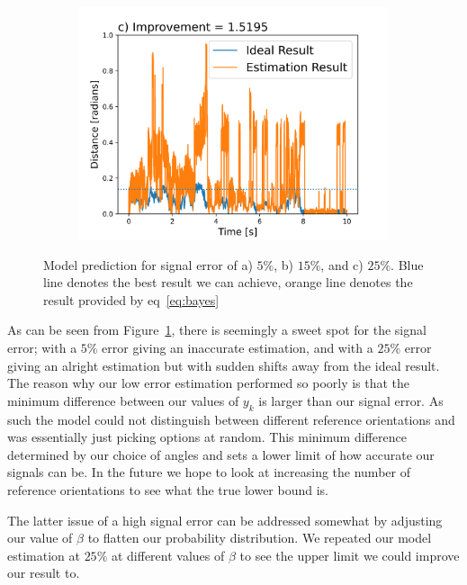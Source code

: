 \documentclass[final, 3p]{elsarticle}
\begin{document}
\begin{figure}[h]
\begin{subfigure}{0.5\textwidth}
		\includegraphics[width=\textwidth]{./Images/epsilon_25.png}
	\end{subfigure}
	\caption{Model prediction for signal error of a) $5\%$, b) $15\%$, and c) $25\%$. Blue line denotes the best result we can achieve, orange line denotes the result provided by eq~\ref{eq:bayes}}
	\label{fig:epsilon}
\end{figure}


As can be seen from Figure~\ref{fig:epsilon}, there is seemingly a
sweet spot for the signal error; with a $5$\% error giving an
inaccurate estimation, and with a $25$\% error giving an alright
estimation but with sudden shifts away from the ideal result. The
reason why our low error estimation performed so poorly is that the
minimum difference between our values of $y_k$ is larger than our
signal error.  As such the model could not distinguish between
different reference orientations and was essentially just picking
options at random.  This minimum difference determined by our choice of
angles and sets a lower limit of how accurate our signals can be.  In
the future we hope to look at increasing the number of reference
orientations to see what the true lower bound is.

The latter issue of a high signal error can be addressed somewhat by
adjusting our value of $\beta$ to flatten our probability
distribution. We repeated our model estimation at $25\%$ at different
values of $\beta$ to see the upper limit we could improve our result
to.
\end{document}
